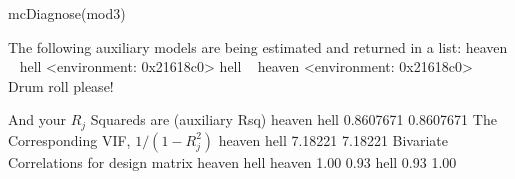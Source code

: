\begin{Schunk}
\begin{Sinput}
 mcDiagnose(mod3)
\end{Sinput}
The following auxiliary models are being estimated and returned in a list:
heaven ~ hell
<environment: 0x21618c0>
hell ~ heaven
<environment: 0x21618c0>
Drum roll please! 

And your $R_j$ Squareds are (auxiliary Rsq)
   heaven      hell 
0.8607671 0.8607671 
The Corresponding VIF, $1/(1-R_j^2)$
 heaven    hell 
7.18221 7.18221 
Bivariate Correlations for design matrix 
       heaven hell
heaven   1.00 0.93
hell     0.93 1.00\end{Schunk}
